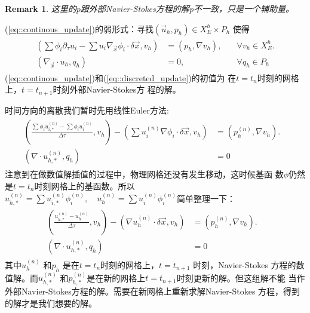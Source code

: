 \documentclass{report}
\theoremstyle{Remark}
\newtheorem{Remark}[theorem]{Remark}
\begin{document}
    \begin{Remark}
       这里的$p$跟外部Navier-Stokes方程的解p不一致，只是一个辅助量。
    \end{Remark}

    (\ref{eq::continous_update})的弱形式：寻找$\left(\vec{u}_h, p_h
    \right) \in X_E^h \times P_h$ 使得
    \begin{eqnarray}
      \begin{aligned}
        \left( \sum \phi_i \partial_{\tau}u_i - \sum u_i
          \nabla_{\vec{x}} \phi_i \cdot \delta \vec{x}, v_h \right)& = 
        \left( p_h, \nabla v_h \right),& \quad \forall v_h \in X_E^h. \\
        \left( \nabla_{\vec{x}} \cdot u_h, q_h \right)& = 0, &\quad
        \forall q_h \in P_h
      \end{aligned}
      \label{eq::discreted_update}
    \end{eqnarray}
    (\ref{eq::continous_update})和(\ref{eq::discreted_update})的初值为
    在$t = t_n$时刻的网格上，$t = t_{n + 1}$时刻外部Navier-Stokes方
    程的解。
      
    时间方向的离散我们暂时先用线性Euler方法:
    \begin{eqnarray}
      \begin{aligned}
        \left ( \frac{\sum \phi_i u_{i, *}^{(n)} - \sum \phi_i
            u_i^{(n)}}{\Delta \tau}, v_h \right) - \left ( \sum
          u_i^{(n)} \nabla \phi_i \cdot \delta \vec{x}, v_h \right) &
        = \left( p_h^{(n)},  \nabla v_h \right).& \\
        \left( \nabla \cdot u_{h, *}^{(n)}, q_h \right) & = 0 & 
      \end{aligned}
    \end{eqnarray}
    注意到在做数值解插值的过程中，物理网格还没有发生移动，这时候基函
    数$\phi$仍然是$t = t_n$时刻网格上的基函数。所以$u_{h,*}^{(n)} = \sum
    u_{i, *}^{(n)} \phi_i^{(n)}, \quad u_h^{(n)} = \sum u_i^{(n)}
      \phi_i^{(n)}$简单整理一下：
    \begin{eqnarray}
      \begin{aligned}
        \left ( \frac{u_{h, *}^{(n)} - u_h^{(n)}}{\Delta \tau}, v_h
        \right) - \left (\nabla u_h^{(n)} \cdot \delta \vec{x}, v_h
        \right) & = \left( p_h^{(n)}, \nabla v_h \right).& \\
        \left( \nabla \cdot u_{h, *}^{(n)}, q_h \right) & = 0 & 
      \end{aligned}
    \end{eqnarray}
    其中$u_h^{(n)}$ 和$p_h$ 是在$t = t_n$时刻的网格上，$t = t_{n + 1}$
    时刻，Navier-Stokes 方程的数值解。而$u_{h, *}^{(n)}$ 和$p_{h,
      *}^{(n)}$是在新的网格上$t = t_{n + 1}$时刻更新的解。但这组解不能
    当作外部Navier-Stokes方程的解。需要在新网格上重新求解Navier-Stokes
    方程，得到的解才是我们想要的解。
\end{document}
